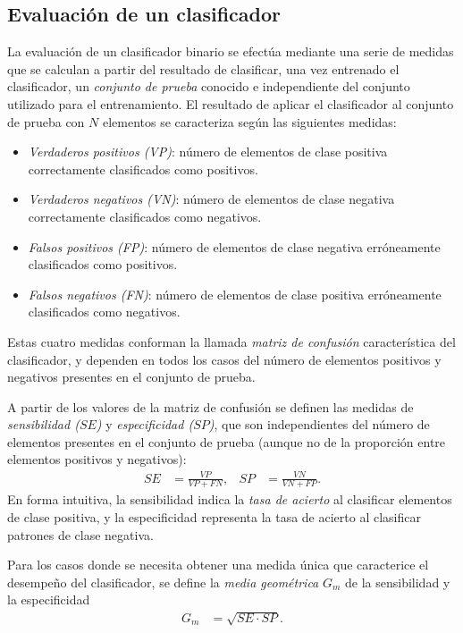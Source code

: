 \documentclass[12pt,bibliography=oldstyle,DIV=12,parskip=half-,titlepage]{scrartcl}
\begin{document}
\subsection{Evaluación de un clasificador}
%
La evaluación de un clasificador binario se efectúa
mediante una serie de medidas que se calculan a partir del resultado
de clasificar, una vez entrenado el clasificador, un \emph{conjunto de
  prueba} conocido e independiente del conjunto utilizado para el
entrenamiento.
El resultado de aplicar el clasificador al conjunto de prueba
con $N$ elementos se caracteriza según las
siguientes medidas:
%
\begin{itemize}[style=nextline,leftmargin=2em]
  \item\emph{Verdaderos positivos (VP)}: número de elementos de clase
    positiva correctamente clasificados como positivos.
  \item\emph{Verdaderos negativos (VN)}: número de elementos de clase
    negativa correctamente clasificados como negativos.
  \item\emph{Falsos positivos (FP)}: número de elementos de clase
    negativa erróneamente clasificados como positivos.
  \item\emph{Falsos negativos (FN)}: número de elementos de clase
    positiva erróneamente clasificados como negativos.
\end{itemize}
%
Estas cuatro medidas conforman la llamada \emph{matriz de confusión}
característica del clasificador, y dependen en todos los casos del
número de elementos positivos y negativos presentes en el conjunto de
prueba.

A partir de los valores de la matriz de confusión se definen las
medidas de \emph{sensibilidad ($SE$)} y \emph{especificidad ($SP$)},
que son independientes del número de elementos presentes en el
conjunto de prueba (aunque no de la proporción entre elementos
positivos y negativos):
\begin{align*}
SE & = \frac{VP}{VP+FN}, & SP & = \frac{VN}{VN+FP}.
\end{align*}
En forma intuitiva, la sensibilidad indica la \emph{tasa de acierto}
al clasificar elementos de clase positiva, y la especificidad
representa la tasa de acierto al clasificar patrones de clase
negativa.

Para los casos donde se necesita obtener una medida única que
caracterice el desempeño del clasificador, se define la \emph{media
  geométrica} $G_m$ de la sensibilidad y la especificidad
\begin{align*}
G_m & = \sqrt{SE\cdot SP}.
\end{align*}
%
%
\end{document}
